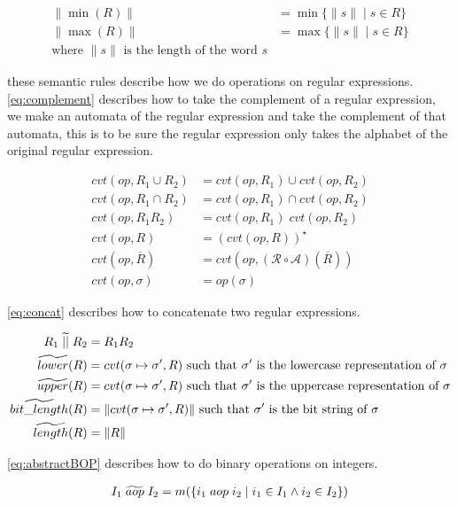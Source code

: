\begin{align}
    \|\min(R)\| &= \min\{ \|s\| \mid s \in R \} \\
    \|\max(R)\| &= \max\{ \|s\| \mid s \in R \} \\
    \text{where $\|s\|$ is the length of the word $s$}
\end{align}

these semantic rules describe how we do operations on regular expressions.
\autoref{eq:complement} describes how to take the complement of a regular expression, we make an automata of the regular expression and take the complement of that automata, this is to be sure the regular expression only takes the alphabet of the original regular expression.

\begin{align}
    cvt(op, R_1 \cup R_2) &= cvt(op, R_1) \cup cvt(op, R_2) \\
    cvt(op, R_1 \cap R_2) &= cvt(op, R_1) \cap cvt(op, R_2) \\
    cvt(op, R_1R_2) &= cvt(op, R_1) \; cvt(op, R_2) \\
    cvt(op, R) &= (cvt(op, R))^\star \\
    cvt(op, \overline{R}) &= cvt(op, (\mathcal{R} \circ \mathcal{A}) (\overline{R})) \\ \label{eq:complement}
    cvt(op, \sigma) &= op(\sigma)
\end{align}

\autoref{eq:concat} describes how to concatenate two regular expressions.

\begin{align}
    R_1 \;\aab{||}\; R_2 &= R_1R_2 \\ \label{eq:concat}
    \aab{lower}(R) &= cvt(\sigma \mapsto \sigma', R) \text{ such that $\sigma'$ is the lowercase representation of $\sigma$}\\
    \aab{upper}(R) &= cvt(\sigma \mapsto \sigma', R) \text{ such that $\sigma'$ is the uppercase representation of $\sigma$}\\
    \aab{bit\_length}(R) &= \|cvt(\sigma \mapsto \sigma', R)\| \text{ such that $\sigma'$ is the bit string of $\sigma$} \\
    \aab{length}(R) &= \|R\|
\end{align}

\autoref{eq:abstractBOP} describes how to do binary operations on integers.

\begin{align}
    I_1 \;\aab{aop}\; I_2 &= m(\{i_1 \; aop \; i_2 \mid i_1 \in I_1 \land i_2 \in I_2\}) \\  \label{eq:abstractBOP}
\end{align}

